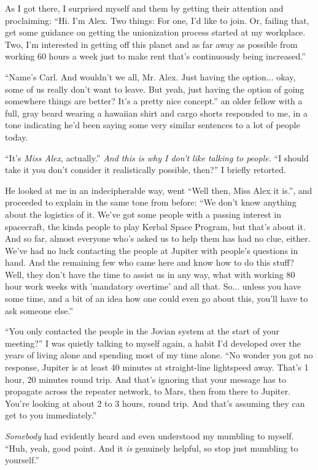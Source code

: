 As I got there, I surprised myself and them by getting their attention and
proclaiming: ``Hi. I'm Alex. Two things: For one, I'd like to join. Or, failing
that, get some guidance on getting the unionization process started at my
workplace. Two, I'm interested in getting off this planet and as far away as
possible from working 60 hours a week just to make rent that's continuously
being increased.''

``Name's Carl. And wouldn't we all, Mr. Alex. Just having the option... okay,
some of us really don't want to leave. But yeah, just having the option of going
somewhere things are better? It's a pretty nice concept.'' an older fellow with
a full, gray beard wearing a hawaiian shirt and cargo shorts responded to me, in
a tone indicating he'd been saying some very similar sentences to a lot of
people today.

``It's \textit{Miss Alex}, actually.'' \textit{And this is why I don't like
  talking to people.} ``I should take it you don't consider it realistically
possible, then?'' I briefly retorted.

He looked at me in an indecipherable way, went ``Well then, Miss Alex it is.'',
and proceeded to explain in the same tone from before: ``We
don't know anything about the logistics of it.  We've got some people with a
passing interest in spacecraft, the kinda people to play Kerbal Space Program,
but that's about it. And so
far, almost everyone who's asked us to help them has had no clue, either. We've
had no luck contacting the people at Jupiter with people's questions in hand.
And the remaining few who came here and know how to do this stuff? Well, they
don't have the time to assist us in any way, what with working 80 hour work
weeks with 'mandatory overtime' and all that. So... unless you have some time,
and a bit of an idea how one could even go about this, you'll have to ask
someone else.''

``You only contacted the people in the Jovian system at the start of your
meeting?'' I was quietly talking to myself again, a habit I'd developed over the
years of living alone and spending most of my time alone. ``No wonder you got no
response, Jupiter is at least 40 minutes at straight-line lightspeed away.
That's 1 hour, 20 minutes round trip. And that's ignoring that your message has
to propagate across the repeater network, to Mars, then from there to Jupiter.
You're looking at about 2 to 3 hours, round trip. And that's assuming they can
get to you immediately.''

\textit{Somebody} had evidently heard and even understood my mumbling to myself.
``Huh, yeah, good point. And it \textit{is} genuinely helpful, so stop just
mumbling to yourself.''

